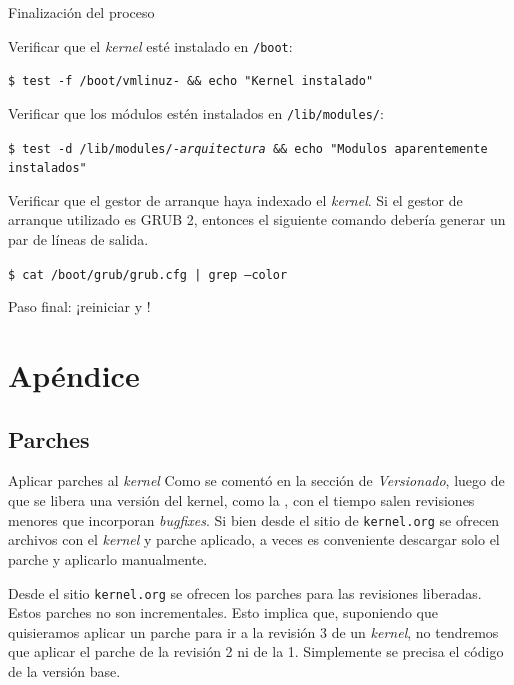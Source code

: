 \begin{frame}{Finalización del proceso}

Verificar que el \textit{kernel} esté instalado en \texttt{/boot}:

{ \tiny
  \begin{block}{}
    \texttt{\$ test -f /boot/vmlinuz-\KERNELBASEVERSION\ \&\& echo "Kernel instalado"}
\end{block} }

Verificar que los módulos estén instalados en
\texttt{/lib/modules/\KERNELBASEVERSION}:

{ \tiny
  \begin{block}{}
    \texttt{\$ test -d /lib/modules/\KERNELBASEVERSION-\textit{arquitectura}
      \&\& echo "Modulos aparentemente instalados"}
\end{block} }

Verificar que el gestor de arranque haya indexado el \textit{kernel}. Si el
gestor de arranque utilizado es GRUB 2, entonces el siguiente comando
debería generar un par de líneas de salida.

  { \tiny
  \begin{block}{}
    \texttt{\$ cat /boot/grub/grub.cfg  | grep --color \KERNELBASEVERSION}
\end{block} }

Paso final: ¡\alert{reiniciar} y !
\end{frame}

\section{Apéndice}
\subsection{Parches}

\begin{frame}{Aplicar parches al \textit{kernel}}
  Como se comentó en la sección de \textit{Versionado}, luego de que se
  libera una versión del kernel, como la \KERNELBASEVERSION, con el tiempo
  salen revisiones menores que incorporan \textit{bugfixes}. Si bien desde
  el sitio de \texttt{kernel.org} se ofrecen archivos con el
  \textit{kernel} y parche aplicado, a veces es conveniente descargar solo
  el parche y aplicarlo manualmente.

  Desde el sitio \texttt{kernel.org} se ofrecen los parches para las
  revisiones liberadas. Estos parches \alert{no son incrementales}. Esto
  implica que, suponiendo que quisieramos aplicar un parche para ir a la
  revisión 3 de un \textit{kernel}, no tendremos que aplicar el parche de
  la revisión 2 ni de la 1. Simplemente se precisa el código de la versión
  base.
\end{frame}


